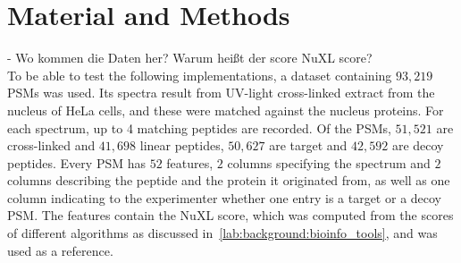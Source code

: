
\chapter{Material and Methods}
\label{matmet}

- Wo kommen die Daten her? Warum heißt der score NuXL score?\\

\label{lab:matmet:dataset}
To be able to test the following implementations, a dataset containing $93,219$ PSMs was used. Its spectra result from UV-light cross-linked extract from the nucleus of HeLa cells, and these were matched against the nucleus proteins. For each spectrum, up to 4 matching peptides are recorded. Of the PSMs, $51,521$ are cross-linked and $41,698$ linear peptides, $50,627$ are target and $42,592$ are decoy peptides. Every PSM has $52$ features, $2$ columns specifying the spectrum and $2$ columns describing the peptide and the protein it originated from, as well as one column indicating to the experimenter whether one entry is a target or a decoy PSM. The features contain the NuXL score, which was computed from the scores of different algorithms as discussed in~\ref{lab:background:bioinfo_tools}, and was used as a reference.
\renewcommand{\baselinestretch}{0.9}
